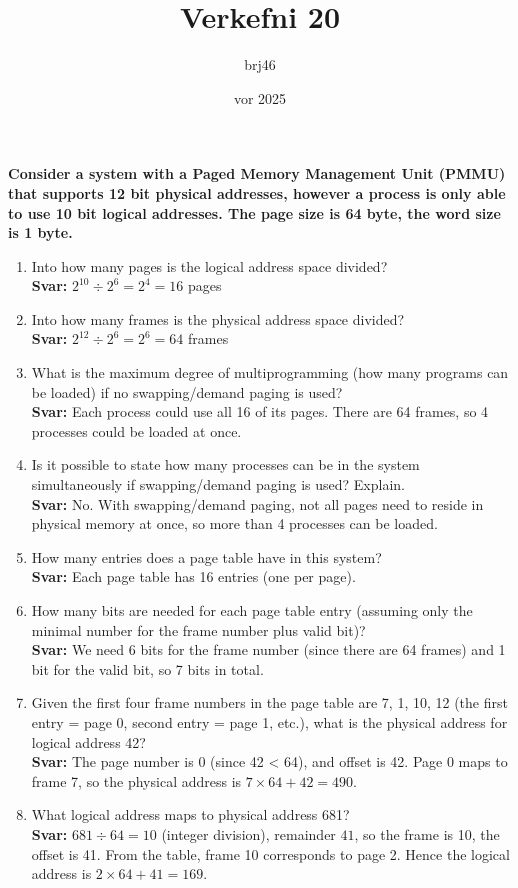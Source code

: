 \documentclass{article}
\title{Verkefni 20}
\author{brj46 }
\date{vor 2025}
\newcommand{\sv}{\textbf{Svar: }}
\newcommand{\bo}[1]{\textbf{#1}}
\begin{document}
\maketitle

\bo{Consider a system with a Paged Memory Management Unit (PMMU) that supports 12 bit
physical addresses, however a process is only able to use 10 bit logical addresses. The page
size is 64 byte, the word size is 1 byte.}

\begin{enumerate}
    \item Into how many pages is the logical address space divided?\\
    \sv{$2^{10} \div 2^6 = 2^4 = 16$ pages}

    \item Into how many frames is the physical address space divided?\\
    \sv{$2^{12} \div 2^6 = 2^6 = 64$ frames}

    \item What is the maximum degree of multiprogramming (how many programs can be loaded) if no swapping/demand paging is used?\\
    \sv{Each process could use all 16 of its pages. There are 64 frames, so 4 processes could be loaded at once.}

    \item Is it possible to state how many processes can be in the system simultaneously if swapping/demand paging is used? Explain.\\
    \sv{No. With swapping/demand paging, not all pages need to reside in physical memory at once, so more than 4 processes can be loaded.}

    \item How many entries does a page table have in this system?\\
    \sv{Each page table has 16 entries (one per page).}

    \item How many bits are needed for each page table entry (assuming only the minimal number for the frame number plus valid bit)?\\
    \sv{We need 6 bits for the frame number (since there are 64 frames) and 1 bit for the valid bit, so 7 bits in total.}

    \item Given the first four frame numbers in the page table are 7, 1, 10, 12 (the first entry = page 0, second entry = page 1, etc.), what is the physical address for logical address 42?\\
    \sv{The page number is 0 (since 42 < 64), and offset is 42. Page 0 maps to frame 7, so the physical address is $7 \times 64 + 42 = 490$.}

    \item What logical address maps to physical address 681?\\
    \sv{$681 \div 64 = 10$ (integer division), remainder $41$, so the frame is 10, the offset is 41. 
    From the table, frame 10 corresponds to page 2. Hence the logical address is $2 \times 64 + 41 = 169$.}

\end{enumerate}
\end{document}
